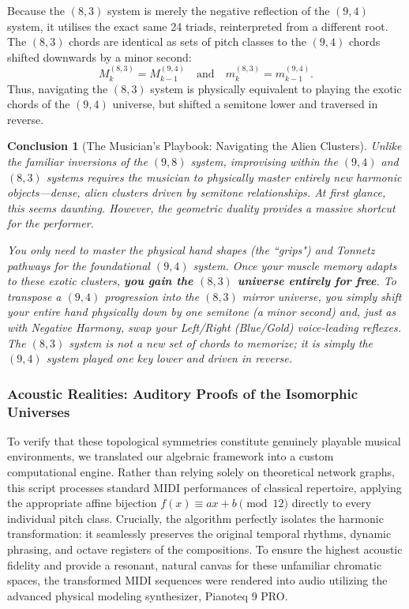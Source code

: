 \documentclass[11pt,letterpaper]{amsart}
\newtheorem{conclusion}{Conclusion}
\begin{document}
Because the $(8,3)$ system is merely the negative reflection of the $(9,4)$ system, it utilises the exact same 24 triads, reinterpreted from a different root. The $(8,3)$ chords are identical as sets of pitch classes to the $(9,4)$ chords shifted downwards by a minor second:
\begin{equation}
    M^{(8,3)}_k = M^{(9,4)}_{k-1} \quad \text{and} \quad m^{(8,3)}_k = m^{(9,4)}_{k-1}.
\end{equation}
Thus, navigating the $(8,3)$ system is physically equivalent to playing the exotic chords of the $(9,4)$ universe, but shifted a semitone lower and traversed in reverse.

\begin{conclusion}[The Musician's Playbook: Navigating the Alien Clusters]
Unlike the familiar inversions of the $(9,8)$ system, improvising within the $(9,4)$ and $(8,3)$ systems requires the musician to physically master entirely new harmonic objects—dense, alien clusters driven by semitone relationships. At first glance, this seems daunting. However, the geometric duality provides a massive shortcut for the performer.

You only need to master the physical hand shapes (the ``grips") and Tonnetz pathways for the foundational $(9,4)$ system. Once your muscle memory adapts to these exotic clusters, \textbf{you gain the $(8,3)$ universe entirely for free}. To transpose a $(9,4)$ progression into the $(8,3)$ mirror universe, you simply shift your entire hand physically down by one semitone (a minor second) and, just as with Negative Harmony, swap your Left/Right (Blue/Gold) voice-leading reflexes. The $(8,3)$ system is not a new set of chords to memorize; it is simply the $(9,4)$ system played one key lower and driven in reverse.
\end{conclusion}

\subsubsection{Acoustic Realities: Auditory Proofs of the Isomorphic Universes}

To verify that these topological symmetries constitute genuinely playable musical environments, we translated our algebraic framework into a custom computational engine. Rather than relying solely on theoretical network graphs, this script processes standard MIDI performances of classical repertoire, applying the appropriate affine bijection $f(x) \equiv ax + b \pmod{12}$ directly to every individual pitch class. Crucially, the algorithm perfectly isolates the harmonic transformation: it seamlessly preserves the original temporal rhythms, dynamic phrasing, and octave registers of the compositions. To ensure the highest acoustic fidelity and provide a resonant, natural canvas for these unfamiliar chromatic spaces, the transformed MIDI sequences were rendered into audio utilizing the advanced physical modeling synthesizer, Pianoteq 9 PRO.
\end{document}
